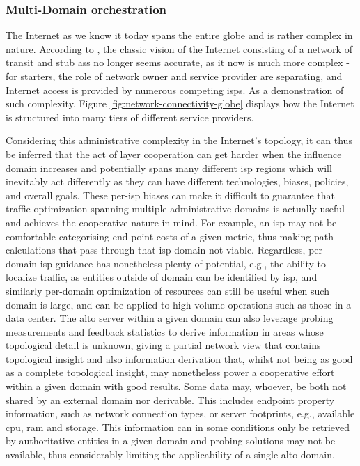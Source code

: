 \subsubsection{Multi-Domain orchestration}

    The Internet as we know it today spans the entire globe and is rather complex in nature.
    According to \cite{dan-Commag10}, the classic vision of the Internet consisting of a network of transit and stub \glspl{as} no longer seems accurate, as it now is much more complex - for starters, the role of network owner and service provider are separating, and Internet access is provided by numerous competing \glspl{isp}.
    As a demonstration of such complexity, Figure \ref{fig:network-connectivity-globe} displays how the Internet is structured into many tiers of different service providers.

    Considering this administrative complexity in the Internet's topology, it can thus be inferred that the act of layer cooperation can get harder when the influence domain increases and potentially spans many different \gls{isp} regions which will inevitably act differently as they can have different technologies, biases, policies, and overall goals.
    These per-\gls{isp} biases can make it difficult to guarantee that traffic optimization spanning multiple administrative domains is actually useful and achieves the cooperative nature in mind.
    For example, an \gls{isp} may not be comfortable categorising end-point costs of a given metric, thus making path calculations that pass through that \gls{isp} domain not viable.
    Regardless, per-domain \gls{isp} guidance has nonetheless plenty of potential, e.g., the ability to localize traffic, as entities outside of domain can be identified by \gls{isp}, and similarly per-domain optimization of resources can still be useful when such domain is large, and can be applied to high-volume operations such as those in a data center.
    The \gls{alto} server within a given domain can also leverage probing measurements and feedback statistics to derive information in areas whose topological detail is unknown, giving a partial network view that contains topological insight and also information derivation that, whilst not being as good as a complete topological insight, may nonetheless power a cooperative effort within a given domain with good results.
    Some data may, whoever, be both not shared by an external domain nor derivable.
    This includes endpoint property information, such as network connection types, or server footprints, e.g., available \gls{cpu}, \gls{ram} and storage.
    This information can in some conditions only be retrieved by authoritative entities in a given domain and probing solutions may not be available, thus considerably limiting the applicability of a single \gls{alto} domain.

